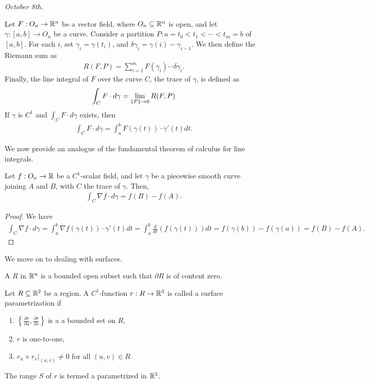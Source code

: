 \textit{October 8th.}

Let $F:O_{n} \to \mathbb{R}^{n}$ be a vector field, where $O_{n} \subseteq \mathbb{R}^{n}$ is open, and let $\gamma:[a,b] \to O_{n}$ be a curve. Consider a partition $P:a = t_{0} < t_{1} < \cdots < t_{m} = b$ of $[a,b]$. For each $i$, set $\gamma_{i} = \gamma(t_{i})$, and $\delta \gamma_{i} = \gamma(i) - \gamma_{i-1}$. We then define the Riemann sum as
\begin{align}
    R(F,P) = \sum_{i=1}^{m} F(\gamma_{i})\cdots \delta \gamma_{i}.
\end{align}
Finally, the line integral of $F$ over the curve $C$, the trace of $\gamma$, is defined as
\begin{align}
    \int_{C} F \cdot d\gamma = \lim_{\left\lVert P\right\rVert \to 0} R(F,P)
\end{align}
If $\gamma$ is $C^{1}$ and $\int_{C} F \cdot d\gamma$ exists, then
\begin{align}
    \int_{C} F \cdot d\gamma = \int_{a}^{b} F(\gamma(t)) \cdot \gamma'(t) dt.
\end{align}

We now provide an analogue of the fundamental theorem of calculus for line integrals.

\begin{theorem}
    Let $f:O_{n} \to \mathbb{R}$ be a $C^{1}$-scalar field, and let $\gamma$ be a piecewise smooth curve joining $A$ and $B$, with $C$ the trace of $\gamma$. Then,
    \begin{align}
        \int_{C} \nabla f \cdot d\gamma = f(B) - f(A).
    \end{align}
\end{theorem}

\begin{proof}
    We have
    \begin{align}
        \int_{C} \nabla f \cdot d\gamma = \int_{a}^{b} \nabla f(\gamma(t)) \cdot \gamma'(t) dt = \int_{a}^{b} \frac{d}{dt}(f(\gamma(t))) dt = f(\gamma(b)) - f(\gamma(a)) = f(B) - f(A).
    \end{align}
\end{proof}

We move on to dealing with surfaces.

\begin{definition}
    A  $R$ in $\mathbb{R}^{n}$ is a bounded open subset such that $\partial R$ is of content zero.
\end{definition}
\begin{definition}
    Let $R \subseteq \mathbb{R}^{2}$ be a region. A $C^{1}$-function $r:R \to \mathbb{R}^{3}$ is called a surface parametrization if
    \begin{enumerate}
        \item $\left\{ \frac{\partial r}{\partial u}, \frac{\partial r}{\partial v}\right\}$ is a a bounded set on $R$,
        \item $r$ is one-to-one,
        \item $r_{u} \times r_{v}|_{(u,v)} \neq 0$ for all $(u,v) \in R$.
    \end{enumerate}
    The range $S$ of $r$ is termed a parametrized  in $\mathbb{R}^{3}$.
\end{definition}

